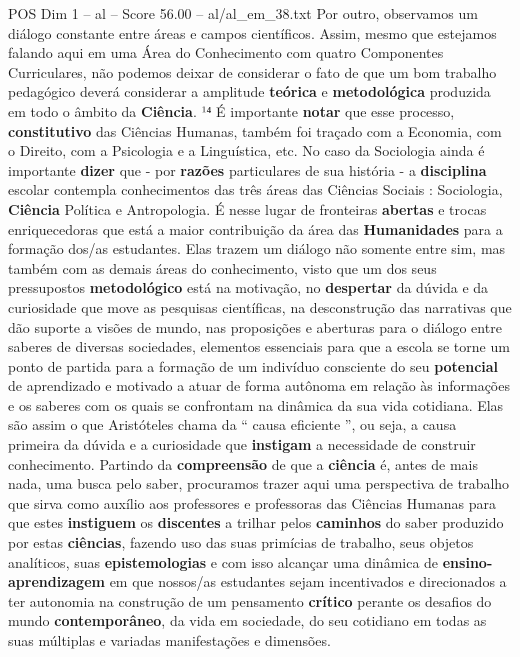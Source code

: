 \begin{textsample}{POS Dim 1 – al – Score 56.00 – al/al\_em\_38.txt}
Por outro, observamos um diálogo constante entre áreas e campos científicos.
Assim, mesmo que estejamos falando aqui em uma Área do Conhecimento com quatro Componentes Curriculares, não podemos deixar de considerar o fato de que um bom trabalho pedagógico deverá considerar a amplitude \textbf{teórica} e \textbf{metodológica} produzida em todo o âmbito da \textbf{Ciência}. ¹⁴ É importante \textbf{notar} que esse processo, \textbf{constitutivo} das Ciências Humanas, também foi traçado com a Economia, com o Direito, com a Psicologia e a Linguística, etc.
No caso da Sociologia ainda é importante \textbf{dizer} que - por \textbf{razões} particulares de sua história - a \textbf{disciplina} escolar contempla conhecimentos das três áreas das Ciências Sociais : Sociologia, \textbf{Ciência} Política e Antropologia.
É nesse lugar de fronteiras \textbf{abertas} e trocas enriquecedoras que está a maior contribuição da área das \textbf{Humanidades} para a formação dos/as estudantes.
Elas trazem um diálogo não somente entre sim, mas também com as demais áreas do conhecimento, visto que um dos seus pressupostos \textbf{metodológico} está na motivação, no \textbf{despertar} da dúvida e da curiosidade que move as pesquisas científicas, na desconstrução das narrativas que dão suporte a visões de mundo, nas proposições e aberturas para o diálogo entre saberes de diversas sociedades, elementos essenciais para que a escola se torne um ponto de partida para a formação de um indivíduo consciente do seu \textbf{potencial} de aprendizado e motivado a atuar de forma autônoma em relação às informações e os saberes com os quais se confrontam na dinâmica da sua vida cotidiana.
Elas são assim o que Aristóteles chama da “ causa eficiente ”, ou seja, a causa primeira da dúvida e a curiosidade que \textbf{instigam} a necessidade de construir conhecimento.
Partindo da \textbf{compreensão} de que a \textbf{ciência} é, antes de mais nada, uma busca pelo saber, procuramos trazer aqui uma perspectiva de trabalho que sirva como auxílio aos professores e professoras das Ciências Humanas para que estes \textbf{instiguem} os \textbf{discentes} a trilhar pelos \textbf{caminhos} do saber produzido por estas \textbf{ciências}, fazendo uso das suas primícias de trabalho, seus objetos analíticos, suas \textbf{epistemologias} e com isso alcançar uma dinâmica de \textbf{ensino-aprendizagem} em que nossos/as estudantes sejam incentivados e direcionados a ter autonomia na construção de um pensamento \textbf{crítico} perante os desafios do mundo \textbf{contemporâneo}, da vida em sociedade, do seu cotidiano em todas as suas múltiplas e variadas manifestações e dimensões.

\end{textsample}
